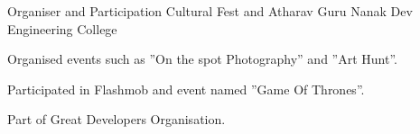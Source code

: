 


\begin{cventries}


\cventry
{Organiser and Participation} %
{Cultural Fest and Atharav } %
{Guru Nanak Dev Engineering College} %
{} %
{ %
\begin{cvitems}
\item {Organised events such as ”On the spot Photography” and ”Art Hunt”.}
\item {Participated in Flashmob and event named ”Game Of Thrones”.}
\item {Part of Great Developers Organisation.}
\end{cvitems}
}
\end{cventries}